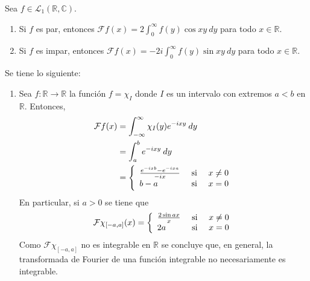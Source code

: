 \documentclass[12pt]{report}
\newcounter{it}
\theoremstyle{largebreak}
\newcommand\cf[3]{\ensuremath{#1:#2\rightarrow#3}}
\newcommand{\fou}[1]{\ensuremath{\mathcal{F}#1}}
\begin{document}
    \begin{cor}
        Sea $f\in\mathcal{L}_1(\mathbb{R},\mathbb{C})$.
        \begin{enumerate}
            \item Si $f$ es par, entonces $\fou{f}(x)=2\int_0^{\infty}f(y)\cos xy\:dy$ para todo $x\in\mathbb{R}$.
            \item Si $f$ es impar, entonces $\fou{f}(x)=-2i\int_0^{\infty}f(y)\sin xy\:dy$ para todo $x\in\mathbb{R}$.
        \end{enumerate}
    \end{cor}

    \begin{exa}
        Se tiene lo siguiente:
        \begin{enumerate}
            \item Sea $\cf{f}{\mathbb{R}}{\mathbb{R}}$ la función $f=\chi_I$ donde $I$ es un intervalo con extremos $a<b$ en $\mathbb{R}$. Entonces,
            \begin{equation*}
                \begin{split}
                    \fou{f}(x)&=\int_{-\infty}^\infty \chi_I(y)e^{ -ixy}\:dy\\
                    &=\int_{a}^b e^{ -ixy}\:dy\\
                    &=\left\{ 
                        \begin{array}{lcr}
                            \frac{e^{ -ixb}-e^{ -ixa}}{-ix} & \textup{ si } & x\neq0\\
                            b-a & \textup{si} & x=0\\
                        \end{array}
                    \right.\\
                \end{split}
            \end{equation*}
            En particular, si $a>0$ se tiene que
            \begin{equation*}
                \fou{\chi_{[-a,a]}}(x)=\left\{ 
                    \begin{array}{lcr}
                        \frac{2\sin ax}{x} & \textup{ si } & x\neq0\\
                        2a & \textup{si} & x=0\\
                    \end{array}
                \right.
            \end{equation*}
            Como $\fou{\chi_{[-a,a]}}$ no es integrable en $\mathbb{R}$ se concluye que, en general, la transformada de Fourier de una función integrable no necesariamente es integrable.

\end{enumerate}
\end{exa}
\end{document}
